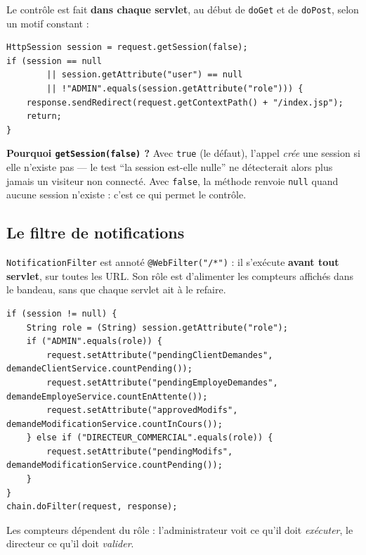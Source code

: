 \vspace{0.6em}
Le contrôle est fait \textbf{dans chaque servlet}, au début de \texttt{doGet}
et de \texttt{doPost}, selon un motif constant :

\begin{lstlisting}[style=java]
HttpSession session = request.getSession(false);
if (session == null
        || session.getAttribute("user") == null
        || !"ADMIN".equals(session.getAttribute("role"))) {
    response.sendRedirect(request.getContextPath() + "/index.jsp");
    return;
}
\end{lstlisting}

\begin{retenir}
\textbf{Pourquoi \texttt{getSession(false)} ?} Avec \texttt{true} (le défaut),
l'appel \emph{crée} une session si elle n'existe pas --- le test
\enquote{la session est-elle nulle} ne détecterait alors plus jamais un
visiteur non connecté. Avec \texttt{false}, la méthode renvoie \texttt{null}
quand aucune session n'existe : c'est ce qui permet le contrôle.
\end{retenir}

\subsection{Le filtre de notifications}

\texttt{NotificationFilter} est annoté \texttt{@WebFilter("/*")} : il s'exécute
\textbf{avant tout servlet}, sur toutes les URL. Son rôle est d'alimenter les
compteurs affichés dans le bandeau, sans que chaque servlet ait à le refaire.

\begin{lstlisting}[style=java]
if (session != null) {
    String role = (String) session.getAttribute("role");
    if ("ADMIN".equals(role)) {
        request.setAttribute("pendingClientDemandes",  demandeClientService.countPending());
        request.setAttribute("pendingEmployeDemandes", demandeEmployeService.countEnAttente());
        request.setAttribute("approvedModifs",         demandeModificationService.countInCours());
    } else if ("DIRECTEUR_COMMERCIAL".equals(role)) {
        request.setAttribute("pendingModifs", demandeModificationService.countPending());
    }
}
chain.doFilter(request, response);
\end{lstlisting}

Les compteurs dépendent du rôle : l'administrateur voit ce qu'il doit
\emph{exécuter}, le directeur ce qu'il doit \emph{valider}.

